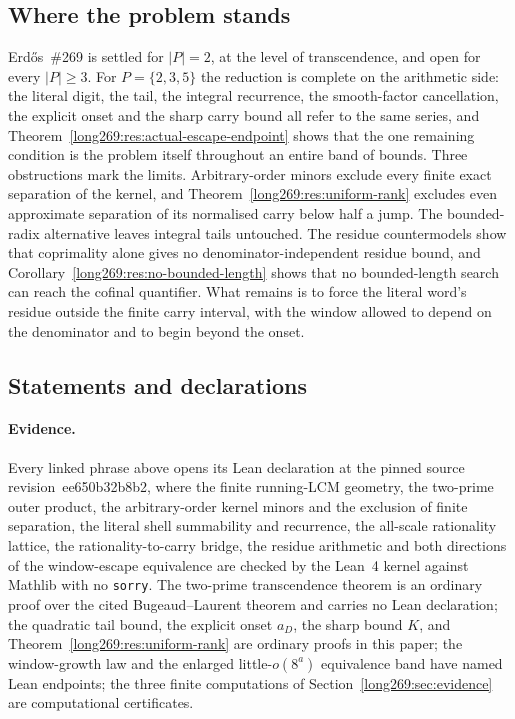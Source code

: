 \documentclass[11pt]{article}
\renewcommand{\commitshort}{ee650b32b8b2}
\begin{document}
\subsection{Where the problem stands}

Erd\H{o}s~\#269 is settled for $|P|=2$, at the level of transcendence, and open
for every $|P|\ge3$.  For $P=\{2,3,5\}$ the reduction is complete on the
arithmetic side: the literal digit, the tail, the integral recurrence, the
smooth-factor cancellation, the explicit onset and the sharp carry bound all
refer to the same series, and Theorem~\ref{long269:res:actual-escape-endpoint} shows
that the one remaining condition is the problem itself throughout an entire
band of bounds.  Three obstructions mark the limits.  Arbitrary-order minors
exclude every finite exact separation of the kernel, and
Theorem~\ref{long269:res:uniform-rank} excludes even approximate separation of its
normalised carry below half a jump.  The bounded-radix alternative leaves
integral tails untouched.  The residue countermodels show that coprimality
alone gives no denominator-independent residue bound, and
Corollary~\ref{long269:res:no-bounded-length} shows that no bounded-length search can
reach the cofinal quantifier.  What remains is to force the literal word's
residue outside the finite carry interval, with the window allowed to depend on
the denominator and to begin beyond the onset.

\subsection*{Statements and declarations}

\paragraph{Evidence.}  Every linked phrase above opens its Lean declaration at
the pinned source revision~\commitshort, where the finite running-LCM geometry,
the two-prime outer product, the arbitrary-order kernel minors and the
exclusion of finite separation, the literal shell summability and recurrence,
the all-scale rationality lattice, the rationality-to-carry bridge, the residue
arithmetic and both directions of the window-escape equivalence are checked by
the Lean~4 kernel against Mathlib with no \texttt{sorry}.  The two-prime
transcendence theorem is an ordinary proof over the cited Bugeaud--Laurent
theorem and carries no Lean declaration; the quadratic tail bound, the explicit
onset $a_D$, the sharp bound $K$, and Theorem~\ref{long269:res:uniform-rank} are ordinary proofs in this paper; the window-growth law and the enlarged little-$o(8^a)$ equivalence band have named Lean endpoints; the three
finite computations of Section~\ref{long269:sec:evidence} are computational
certificates.
\end{document}
